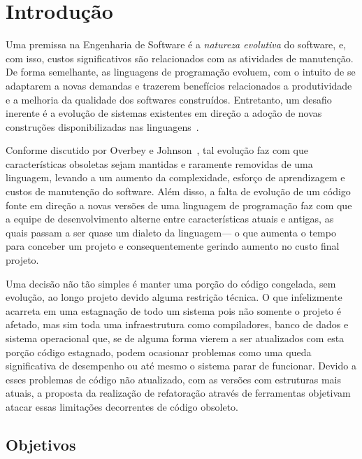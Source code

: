 \chapter{Introdução}

Uma premissa na Engenharia de Software é a \emph{natureza evolutiva} do software, e, com isso, 
custos significativos são relacionados com as atividades de manutenção. De forma semelhante, 
as linguagens de programação evoluem, com o intuito de se adaptarem a novas demandas e trazerem 
benefícios relacionados a produtividade e a melhoria da qualidade dos softwares construídos. Entretanto, um 
desafio inerente é a evolução de sistemas existentes em direção a adoção de novas construções 
disponibilizadas nas linguagens~\cite{Dyer:2013}. 

Conforme discutido por Overbey e Johnson~\cite{Overbey:2009}, 
tal evolução faz com que características obsoletas sejam mantidas e raramente removidas de uma linguagem, 
levando a um aumento da complexidade, esfor\c co de aprendizagem e custos de manutenção do software. 
Al\'{e}m disso, a falta de evolu\c c\~{a}o de um c\'{o}digo fonte em dire\c c\~{a}o a 
novas vers\~{o}es de uma linguagem de programa\c c\~{a}o faz com que a equipe de 
desenvolvimento alterne entre caracter\'{i}sticas atuais e antigas, as quais passam a ser 
quase um dialeto da linguagem--- o que aumenta o tempo para conceber um projeto 
e consequentemente gerindo aumento no custo final projeto.

Uma decisão não tão simples é manter uma porção do código congelada, sem evolução, ao longo projeto devido alguma restrição técnica. O que infelizmente acarreta em uma estagnação de todo um sistema pois não somente o projeto \'{e} afetado, mas sim toda uma infraestrutura como compiladores, banco de dados e sistema operacional que, se de alguma forma vierem a ser atualizados com esta porção código estagnado, 
podem ocasionar problemas como uma queda significativa de desempenho ou até mesmo o sistema parar de funcionar. Devido a esses problemas de código não atualizado, com as versões com estruturas mais atuais, a proposta da realização de refatoração através de 
ferramentas objetivam atacar essas limita\c c\~{o}es decorrentes de código obsoleto.

\section{Objetivos}
	
